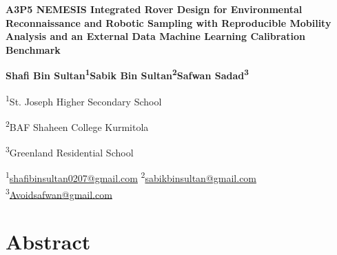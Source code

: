\documentclass[11pt,a4paper]{article}
\begin{document}
\thispagestyle{fancy}
\begin{center}
{\fontsize{18.5}{22}\selectfont\bfseries A3P5 NEMESIS Integrated Rover Design for Environmental Reconnaissance and Robotic Sampling with Reproducible Mobility Analysis and an External Data Machine Learning Calibration Benchmark\par}
\vspace{7pt}
{\normalsize\bfseries Shafi Bin Sultan\textsuperscript{1}\quad Sabik Bin Sultan\textsuperscript{2}\quad Safwan Sadad\textsuperscript{3}\par}
\vspace{4pt}
{\small\textsuperscript{1}St. Joseph Higher Secondary School\par
\textsuperscript{2}BAF Shaheen College Kurmitola\par
\textsuperscript{3}Greenland Residential School\par}
\vspace{3pt}
{\footnotesize\textsuperscript{1}\href{mailto:shafibinsultan0207@gmail.com}{shafibinsultan0207@gmail.com}\quad
\textsuperscript{2}\href{mailto:sabikbinsultan@gmail.com}{sabikbinsultan@gmail.com}\quad
\textsuperscript{3}\href{mailto:Avoidsafwan@gmail.com}{Avoidsafwan@gmail.com}\par}
\end{center}
\FloatBarrier

\section*{Abstract}
\end{document}
